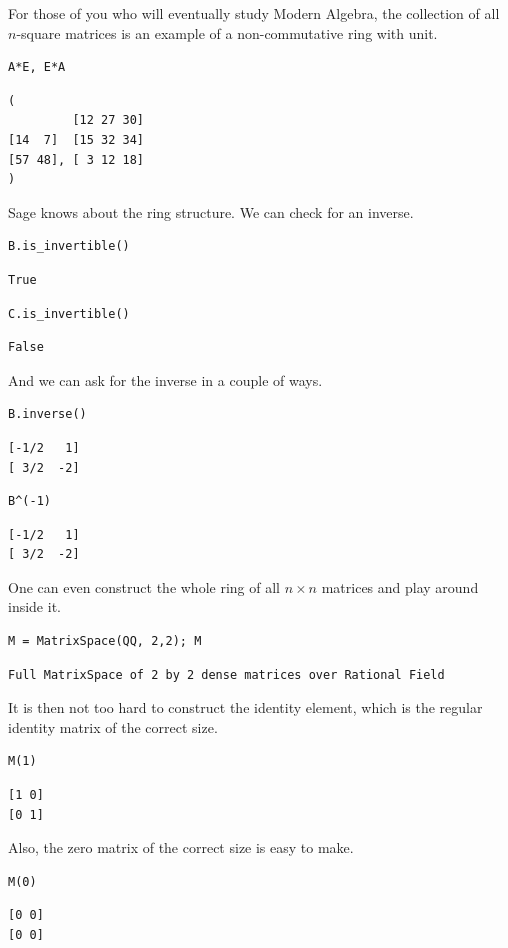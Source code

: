 \documentclass[10pt,]{book}
\theoremstyle{plain}
\numberwithin{equation}{section}
\begin{document}
        For those of you who will eventually study Modern Algebra, the collection
        of all \(n\)-square matrices is an example of a non-commutative ring
        with unit.
\begin{lstlisting}[style=sageinput]
A*E, E*A
\end{lstlisting}
\begin{lstlisting}[style=sageoutput]
(
         [12 27 30]
[14  7]  [15 32 34]
[57 48], [ 3 12 18]
)
\end{lstlisting}
\par
Sage knows about the ring structure. We can check for an inverse.%
\begin{lstlisting}[style=sageinput]
B.is_invertible()
\end{lstlisting}
\begin{lstlisting}[style=sageoutput]
True
\end{lstlisting}
\begin{lstlisting}[style=sageinput]
C.is_invertible()
\end{lstlisting}
\begin{lstlisting}[style=sageoutput]
False
\end{lstlisting}
\par
And we can ask for the inverse in a couple of ways.%
\begin{lstlisting}[style=sageinput]
B.inverse()
\end{lstlisting}
\begin{lstlisting}[style=sageoutput]
[-1/2   1]
[ 3/2  -2]
\end{lstlisting}
\begin{lstlisting}[style=sageinput]
B^(-1)
\end{lstlisting}
\begin{lstlisting}[style=sageoutput]
[-1/2   1]
[ 3/2  -2]
\end{lstlisting}
\par
One can even construct the whole ring of all \(n\times n\) matrices
      and play around inside it.%
\begin{lstlisting}[style=sageinput]
M = MatrixSpace(QQ, 2,2); M
\end{lstlisting}
\begin{lstlisting}[style=sageoutput]
Full MatrixSpace of 2 by 2 dense matrices over Rational Field
\end{lstlisting}
\par
It is then not too hard to construct the identity element, which is
        the regular identity matrix of the correct size.
\begin{lstlisting}[style=sageinput]
M(1)
\end{lstlisting}
\begin{lstlisting}[style=sageoutput]
[1 0]
[0 1]
\end{lstlisting}
\par
Also, the zero matrix of the correct size is easy to make.%
\begin{lstlisting}[style=sageinput]
M(0)
\end{lstlisting}
\begin{lstlisting}[style=sageoutput]
[0 0]
[0 0]
\end{lstlisting}
\par
\end{document}
